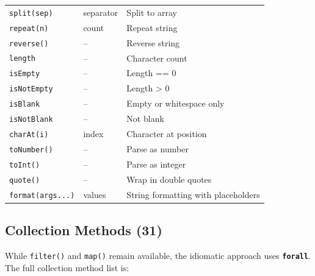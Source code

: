 \documentclass[11pt,a4paper]{article}
\newcommand{\kw}[1]{\texttt{\textbf{#1}}}
\begin{document}
\begin{longtable}{@{}lll@{}}
\texttt{split(sep)} & separator & Split to array \\
\texttt{repeat(n)} & count & Repeat string \\
\texttt{reverse()} & -- & Reverse string \\
\texttt{length} & -- & Character count \\
\texttt{isEmpty} & -- & Length == 0 \\
\texttt{isNotEmpty} & -- & Length > 0 \\
\texttt{isBlank} & -- & Empty or whitespace only \\
\texttt{isNotBlank} & -- & Not blank \\
\texttt{charAt(i)} & index & Character at position \\
\texttt{toNumber()} & -- & Parse as number \\
\texttt{toInt()} & -- & Parse as integer \\
\texttt{quote()} & -- & Wrap in double quotes \\
\texttt{format(args...)} & values & String formatting with placeholders \\
\bottomrule
\end{longtable}

\subsection{Collection Methods (31)}

While \texttt{filter()} and \texttt{map()} remain available, the idiomatic approach uses \kw{forall}. The full collection method list is:
\end{document}
